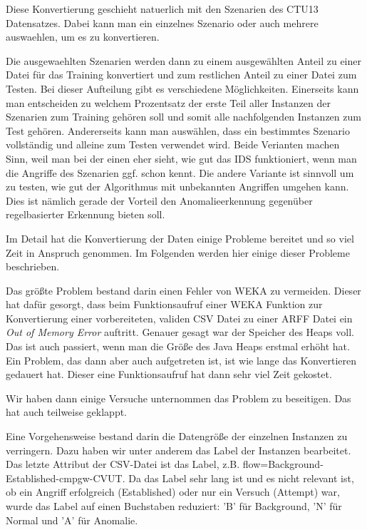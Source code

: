 \documentclass[main.tex]{subfiles}
\begin{document}
Diese Konvertierung geschieht natuerlich mit den Szenarien des CTU13
Datensatzes.
Dabei kann man ein einzelnes Szenario oder auch mehrere auswaehlen, um es zu
konvertieren.

Die ausgewaehlten Szenarien werden dann zu einem ausgewählten Anteil zu einer Datei
für das Training konvertiert und zum restlichen Anteil zu einer Datei zum Testen.
Bei dieser Aufteilung gibt es verschiedene Möglichkeiten. Einerseits kann man
entscheiden zu welchem Prozentsatz der erste Teil aller Instanzen der
Szenarien zum Training gehören soll und somit alle nachfolgenden Instanzen zum
Test gehören.
Andererseits kann man auswählen, dass ein bestimmtes Szenario vollständig und
alleine zum Testen verwendet wird.
Beide Verianten machen Sinn, weil man bei der einen eher sieht, wie gut das IDS
funktioniert, wenn man die Angriffe des Szenarien ggf. schon kennt.
Die andere Variante ist sinnvoll um zu testen, wie gut der Algorithmus mit
unbekannten Angriffen umgehen kann. Dies ist nämlich gerade der Vorteil den
Anomalieerkennung gegenüber regelbasierter Erkennung bieten soll.

Im Detail hat die Konvertierung der Daten einige Probleme bereitet und so viel
Zeit in Anspruch genommen.
Im Folgenden werden hier einige dieser Probleme beschrieben.

Das größte Problem bestand darin einen Fehler von WEKA zu vermeiden. Dieser hat
dafür gesorgt, dass beim Funktionsaufruf einer WEKA Funktion zur Konvertierung
einer vorbereiteten, validen CSV Datei zu einer ARFF Datei ein \textit{Out of Memory Error} auftritt.
Genauer gesagt war der Speicher des Heaps voll. Das ist auch passiert, wenn man
die Größe des Java Heaps erstmal erhöht hat. Ein Problem, das dann aber auch
aufgetreten ist, ist wie lange das Konvertieren gedauert hat.
Dieser eine Funktionsaufruf hat dann sehr viel Zeit gekostet.

Wir haben dann einige Versuche unternommen das Problem zu beseitigen.
Das hat auch teilweise geklappt.

Eine Vorgehensweise bestand darin die Datengröße der einzelnen Instanzen zu
verringern.
Dazu haben wir unter anderem das Label der Instanzen bearbeitet.
Das letzte Attribut der CSV-Datei ist das Label, z.B. flow=Background-Established-cmpgw-CVUT.
Da das Label sehr lang ist und es nicht relevant ist, ob ein Angriff erfolgreich (Established) oder nur ein Versuch (Attempt) war, wurde das Label auf einen Buchstaben reduziert: 'B' für Background, 'N' für Normal und 'A' für Anomalie.\\
\end{document}
